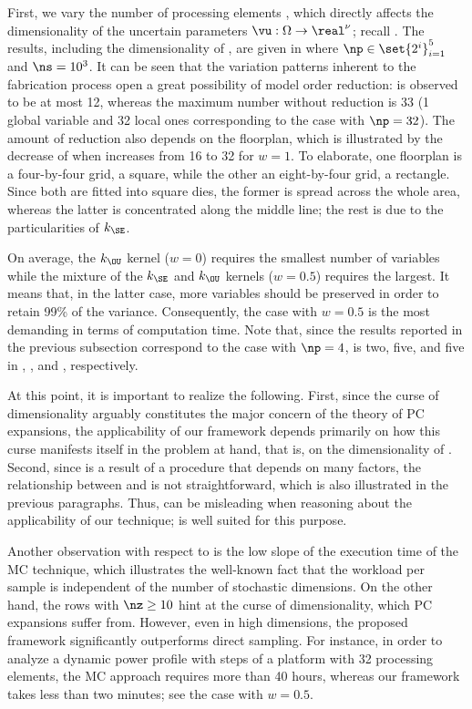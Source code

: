 First, we vary the number of processing elements \np, which directly affects the
dimensionality of the uncertain parameters $\vu: \Omega \to \real^\nu$; recall
. The results, including the dimensionality
\nz of \vz, are given in  where $\np \in
\set{2^i}_{i = 1}^5$ and $\ns = 10^3$. It can be seen that the variation
patterns inherent to the fabrication process \cite{cheng2011} open a great
possibility of model order reduction: \nz is observed to be at most 12, whereas
the maximum number without reduction is 33 (1 global variable and 32 local ones
corresponding to the case with $\np = 32$). The amount of reduction also depends
on the floorplan, which is illustrated by the decrease of \nz when \np increases
from 16 to 32 for $w = 1$. To elaborate, one floorplan is a four-by-four grid, a
square, while the other an eight-by-four grid, a rectangle. Since both are
fitted into square dies, the former is spread across the whole area, whereas the
latter is concentrated along the middle line; the rest is due to the
particularities of $k_\SE$.

On average, the $k_\OU$ kernel ($w = 0$) requires the smallest number of
variables while the mixture of the $k_\SE$ and $k_\OU$ kernels ($w = 0.5$)
requires the largest. It means that, in the latter case, more variables should
be preserved in order to retain 99\% of the variance. Consequently, the case
with $w = 0.5$ is the most demanding in terms of computation time. Note that,
since the results reported in the previous subsection correspond to the case
with $\np = 4$, \nz is two, five, and five in ,
, and ,
respectively.

At this point, it is important to realize the following. First, since the curse
of dimensionality arguably constitutes the major concern of the theory of
\ac{PC} expansions, the applicability of our framework depends primarily on how
this curse manifests itself in the problem at hand, that is, on the
dimensionality \nz of \vz. Second, since \vz is a result of a procedure that
depends on many factors, the relationship between \vu and \vz is not
straightforward, which is also illustrated in the previous paragraphs. Thus, \nu
can be misleading when reasoning about the applicability of our technique; \nz
is well suited for this purpose.

Another observation with respect to  is the
low slope of the execution time of the \ac{MC} technique, which illustrates the
well-known fact that the workload per sample is independent of the number of
stochastic dimensions. On the other hand, the rows with $\nz \geq 10$ hint at
the curse of dimensionality, which \ac{PC} expansions suffer from. However, even
in high dimensions, the proposed framework significantly outperforms direct
sampling. For instance, in order to analyze a dynamic power profile with
 steps of a platform with 32 processing elements, the \ac{MC}
approach requires more than 40 hours, whereas our framework takes less than two
minutes; see the case with $w = 0.5$.

